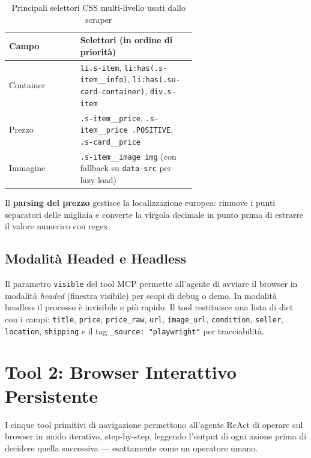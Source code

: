 \begin{table}[htbp]
\centering
\caption{Principali selettori CSS multi-livello usati dallo scraper}
\label{tab:pw-selectors}
\begin{tabular}{lp{0.62\linewidth}}
\hline
\textbf{Campo} & \textbf{Selettori (in ordine di priorità)} \\
\hline
Container & \texttt{li.s-item}, \texttt{li:has(.s-item\_\_info)}, \texttt{li:has(.su-card-container)}, \texttt{div.s-item} \\
Prezzo    & \texttt{.s-item\_\_price}, \texttt{.s-item\_\_price .POSITIVE}, \texttt{.s-card\_\_price} \\
Immagine  & \texttt{.s-item\_\_image img} (con fallback su \texttt{data-src} per lazy load) \\
\hline
\end{tabular}
\end{table}

Il \textbf{parsing del prezzo} gestisce la localizzazione europea:
rimuove i punti separatori delle migliaia e converte la virgola
decimale in punto prima di estrarre il valore numerico con regex.

\subsection{Modalità Headed e Headless}
\label{subsec:pw-scrape-mode}

Il parametro \texttt{visible} del tool MCP permette all'agente di
avviare il browser in modalità \emph{headed} (finestra visibile) per
scopi di debug o demo. In modalità headless il processo è invisibile
e più rapido. Il tool restituisce una lista di dict con i campi:
\texttt{title}, \texttt{price}, \texttt{price\_raw}, \texttt{url},
\texttt{image\_url}, \texttt{condition}, \texttt{seller},
\texttt{location}, \texttt{shipping} e il tag \texttt{\_source:
"playwright"} per tracciabilità.


\section{Tool 2: Browser Interattivo Persistente}
\label{sec:pw-browser}

I cinque tool primitivi di navigazione permettono all'agente ReAct di
operare sul browser in modo iterativo, step-by-step, leggendo
l'output di ogni azione prima di decidere quella successiva — esattamente
come un operatore umano.

